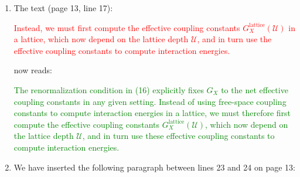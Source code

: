 \documentclass[preprint,showkeys,nofootinbib]{revtex4-1}
\renewcommand{\t}{\text} %
\newcommand{\p}[1]{\left(#1\right)} %
\renewcommand{\O}{\mathcal{O}}
\newcommand{\U}{\mathcal{U}}
\newcommand{\1}{\mathds{1}}
\newcommand{\shrink}[1]{\scalebox{0.8}{#1}} %
\newcommand{\red}[1]{\textcolor{red}{#1}}
\newcommand{\green}[1]{\textcolor{green}{#1}}
\newcounter{point}
\begin{document}
\begin{enumerate}[label=(R1.\arabic{point}.\arabic*)]
{\begin{align*}
{{\begin{tikzpicture}
\begin{feynman}
              \vertex[below right = of v2] (f4);
              \diagram* {
                (f1) -- (v1),
                (f2) -- (v1),
                (v2) -- (f3),
                (v2) -- (f4),
                (v1) --[scalar, half left] (v2),
                (v1) --[scalar, half right] (v2) };
            \end{feynman}
          \end{tikzpicture}}
        \\ \O(G^2)}
      + \cdots = \substack{
        \shrink{
          \begin{tikzpicture}
            \begin{feynman}
              \vertex (v);
              \vertex[above left = of v] (f1);
              \vertex[below left = of v] (f2);
              \vertex[above right = of v] (f3);
              \vertex[below right = of v] (f4);
              \diagram* {
                (f1) -- (v),
                (f2) -- (v),
                (v) -- (f3),
                (v) -- (f4) };
            \end{feynman}
          \end{tikzpicture}}
        \\ \O(G)}.
      \tag{16}
    \end{align*}
    This renormalization condition has the benefit of allowing us to
    express effective two-body interactions simply in terms of net
    effective two-body coupling constants, rather than in terms of
    long sums at all order of the bare coupling constants.}


\item The text (page 13, line 17):

  \red{Instead, we must first compute the effective coupling constants
    $G_X^{\t{lattice}}\p{\U}$ in a lattice, which now depend on the
    lattice depth $\U$, and in turn use the effective coupling
    constants to compute interaction energies.}

  now reads:

  \green{The renormalization condition in (16) explicitly fixes $G_X$
    to the net effective coupling constants in any given setting.
    Instead of using free-space coupling constants to compute
    interaction energies in a lattice, we must therefore first compute
    the effective coupling constants $G_X^{\t{lattice}}\p{\U}$, which
    now depend on the lattice depth $\U$, and in turn use these
    effective coupling constants to compute interaction energies.}


\item We have inserted the following paragraph between lines 23 and 24
  on page 13:


\end{enumerate}
\end{document}

